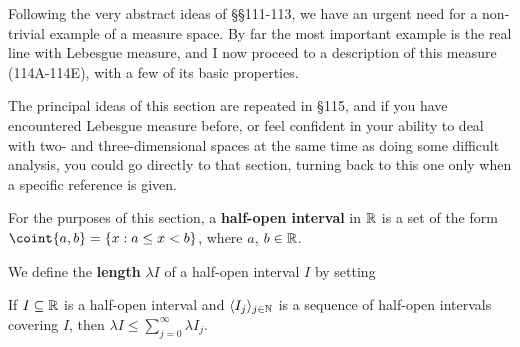 
\def\chaptername{Measure spaces}
\def\sectionname{Lebesgue measure on $\Bbb R$}

\def\headlinesectionname{Lebesgue measure on ${\eightBbb R}$}

Following the very abstract ideas of \S\S111-113, we have an urgent
need for a non-trivial example of a measure space.   By far the most
important example is the real line with Lebesgue measure, and I now
proceed to a description of this measure (114A-114E), with a few of its
basic properties.

The principal ideas of this section are repeated in \S115, and if
you have encountered Lebesgue measure before, or feel confident in your
ability to deal with two- and three-dimensional spaces at the same time
as doing some difficult analysis, you could go directly to that
section, turning back to this one only when a specific reference is
given.

 For the purposes of this section, a {\bf
half-open interval} in $\Bbb R$ is a set of the form
$\coint{a,b}=\{x:a\le x<b\}$, where $a$, $b\in\Bbb R$.


   We define the {\bf length}
$\lambda I$ of a half-open interval $I$ by setting


 If $I\subseteq\Bbb R$ is a half-open interval and
$\langle I_j\rangle_{j\in\Bbb N}$ is a sequence of half-open intervals
covering $I$, then $\lambda I\le\sum_{j=0}^{\infty}\lambda I_j$.

